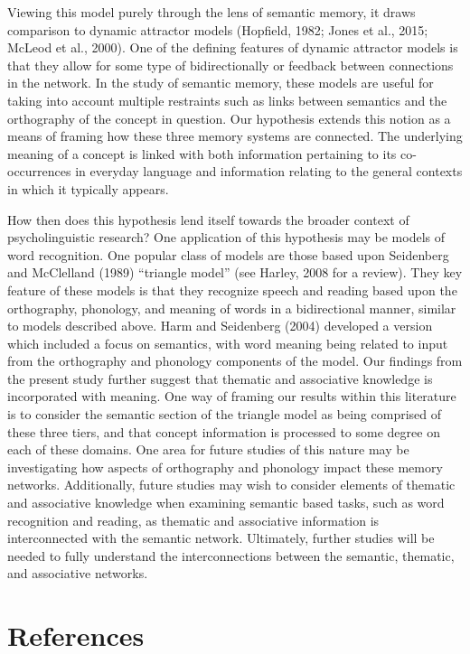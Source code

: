 \documentclass[english,man]{apa6}
\theoremstyle{definition}
\theoremstyle{definition}
\theoremstyle{definition}
\theoremstyle{remark}
\begin{document}
Viewing this model purely through the lens of semantic memory, it draws
comparison to dynamic attractor models (Hopfield, 1982; Jones et al.,
2015; McLeod et al., 2000). One of the defining features of dynamic
attractor models is that they allow for some type of bidirectionally or
feedback between connections in the network. In the study of semantic
memory, these models are useful for taking into account multiple
restraints such as links between semantics and the orthography of the
concept in question. Our hypothesis extends this notion as a means of
framing how these three memory systems are connected. The underlying
meaning of a concept is linked with both information pertaining to its
co-occurrences in everyday language and information relating to the
general contexts in which it typically appears.

How then does this hypothesis lend itself towards the broader context of
psycholinguistic research? One application of this hypothesis may be
models of word recognition. One popular class of models are those based
upon Seidenberg and McClelland (1989) \enquote{triangle model} (see
Harley, 2008 for a review). They key feature of these models is that
they recognize speech and reading based upon the orthography, phonology,
and meaning of words in a bidirectional manner, similar to models
described above. Harm and Seidenberg (2004) developed a version which
included a focus on semantics, with word meaning being related to input
from the orthography and phonology components of the model. Our findings
from the present study further suggest that thematic and associative
knowledge is incorporated with meaning. One way of framing our results
within this literature is to consider the semantic section of the
triangle model as being comprised of these three tiers, and that concept
information is processed to some degree on each of these domains. One
area for future studies of this nature may be investigating how aspects
of orthography and phonology impact these memory networks. Additionally,
future studies may wish to consider elements of thematic and associative
knowledge when examining semantic based tasks, such as word recognition
and reading, as thematic and associative information is interconnected
with the semantic network. Ultimately, further studies will be needed to
fully understand the interconnections between the semantic, thematic,
and associative networks.

\newpage

\section{References}\label{references}
\end{document}
